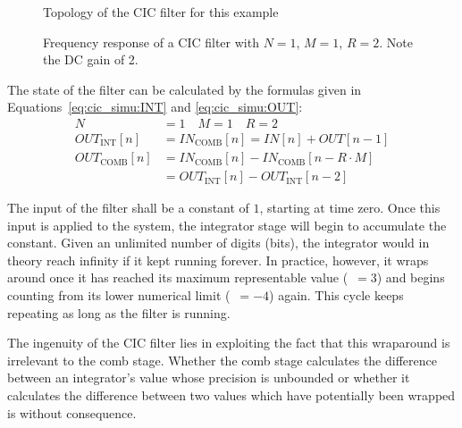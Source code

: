 \begin{figure}
    \centering
    
    \caption[Topology of Example Filter]{Topology of the CIC filter for this example}
    \label{fig:cic_simu:topo}
\end{figure}

\begin{figure}
    \centering
    
    \caption[Frequency Respose of Example CIC Filter]{%
        Frequency response of a CIC  filter with $N=1$, $M=1$, $R=2$. Note the
        DC gain of \num{2}.%
    }
    \label{fig:cic_simu:freqz}
\end{figure}

The  state  of  the  filter  can  be  calculated  by  the  formulas  given  in
Equations~\ref{eq:cic_simu:INT} and \ref{eq:cic_simu:OUT}:
\begin{align}
    N             & = 1 \quad M = 1 \quad R=2\nonumber\\
    OUT_\mathrm{INT}[n]  & = IN_\mathrm{COMB}[n] = IN[n]        + OUT[n-1]
    \label{eq:cic_simu:INT} \\
    OUT_\mathrm{COMB}[n] & = IN_\mathrm{COMB}[n] - IN_\mathrm{COMB}[n-R\cdot M]
    \nonumber\\
                  & = OUT_\mathrm{INT}[n] - OUT_\mathrm{INT}[n-2]
    \label{eq:cic_simu:OUT}
\end{align}

The  input  of the  filter  shall  be a  constant  of  $1$, starting  at  time
zero. Once this  input is  applied to  the system,  the integrator  stage will
begin  to  accumulate  the  constant. Given  an  unlimited  number  of  digits
(bits),  the integrator  would in  theory reach  infinity if  it kept  running
forever. In practice, however, it wraps around once it has reached its maximum
representable value  (~$ =  3$) and begins  counting from  its lower
numerical limit  (~$=-4$) again. This cycle keeps  repeating as long
as the filter is running.

The  ingenuity of  the  CIC filter  lies  in exploiting  the  fact that  this
wraparound is irrelevant to the  comb stage. Whether the comb stage calculates
the difference between  an integrator's value whose precision  is unbounded or
whether it calculates the difference between two values which have potentially
been  wrapped  is  without  consequence.

